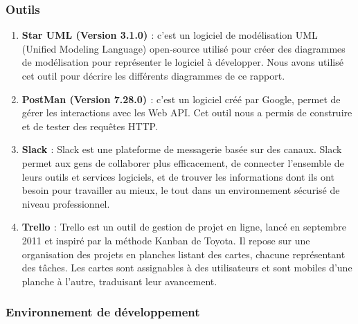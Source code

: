 \subsubsection{Outils }
\begin{enumerate}
    \item \textbf{Star UML (Version 3.1.0) \cite{staruml}}: c’est un logiciel de modélisation UML (Unified Modeling Language) open-source utilisé pour créer des diagrammes de modélisation pour représenter le logiciel à développer.
    Nous avons utilisé cet outil pour décrire les différents diagrammes de ce rapport.
    \item \textbf{PostMan (Version 7.28.0) \cite{postman}}: c’est un logiciel créé par Google, permet de gérer les interactions avec les Web API. Cet outil nous a permis de construire et de tester des requêtes HTTP.
    
    \item\textbf{Slack \cite{slack}}: Slack est une plateforme de messagerie basée sur des canaux. Slack permet aux gens de collaborer plus efficacement, de connecter l’ensemble de leurs outils et services logiciels, et de trouver les informations dont ils ont besoin pour travailler au mieux, le tout dans un environnement sécurisé de niveau professionnel.
    
    \item\textbf{Trello \cite{trello}}: Trello est un outil de gestion de projet en ligne, lancé en septembre 2011 et inspiré par la méthode Kanban de Toyota. Il repose sur une organisation des projets en planches listant des cartes, chacune représentant des tâches. Les cartes sont assignables à des utilisateurs et sont mobiles d'une planche à l'autre, traduisant leur avancement.
 
     
\end{enumerate}

\subsubsection{Environnement de développement }

